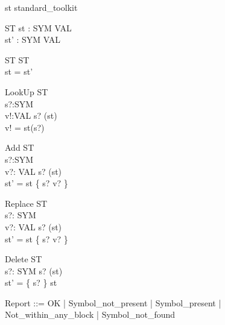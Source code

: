 \begin{zsection}
  \SECTION st \parents standard\_toolkit
\end{zsection}

\begin{zed}
\end{zed}


\begin{schema}{\Delta ST}
 st : SYM \pfun VAL \\
 st' : SYM \pfun VAL \\
\end{schema}


\begin{schema}{\Xi ST}
  \Delta ST \\
\where
  st = st'
\end{schema}

\begin{schema}{LookUp}
  \Xi ST \\
  s?:SYM \\
  v!:VAL
\where
  s? \in \dom(st) \\
  v! = st(s?)
\end{schema}

\begin{schema}{Add}
  \Delta ST \\
  s?:SYM \\
  v?: VAL
\where
  s? \notin \dom(st) \\
  st' = st \cup \{ s? \mapsto v? \}
\end{schema}

\begin{schema}{Replace}
  \Delta ST \\
  s?: SYM \\
  v?: VAL
\where
  s? \in \dom(st) \\
  st' = st \oplus \{ s? \mapsto v? \}
\end{schema}

\begin{schema}{Delete}
  \Delta ST \\
  s?: SYM
\where
 s? \in \dom(st) \\
  st' = \{ s? \} \ndres st
\end{schema}

\begin{zed}
  Report ::= OK
                  | Symbol\_not\_present
		  | Symbol\_present
		  | Not\_within\_any\_block
		  | Symbol\_not\_found
\end{zed}

